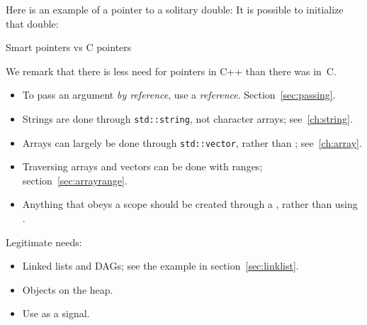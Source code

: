 Here is an example of a pointer to a solitary double:
%
%
It is possible to initialize that double:
%

 {Smart pointers vs C pointers}

We remark that there is less need for pointers in C++
than there was in~C.

\begin{itemize}
\item To pass an argument
  \emph{by reference},
  use a \emph{reference}.
  Section~\ref{sec:passing}.
\item Strings are done through \lstinline{std::string}, not character arrays;
  see~\ref{ch:string}.
\item Arrays can largely be done through \lstinline{std::vector}, rather than
  ; see~\ref{ch:array}.
\item Traversing arrays and vectors can be done with ranges;
  section~\ref{sec:arrayrange}.
\item Anything that obeys a scope should be created through a
  , rather than using .
\end{itemize}

Legitimate needs:
\begin{itemize}
\item Linked lists and \acp{DAG}; see the example in section~\ref{sec:linklist}.
\item Objects on the heap.
\item Use  as a signal.
\end{itemize}

